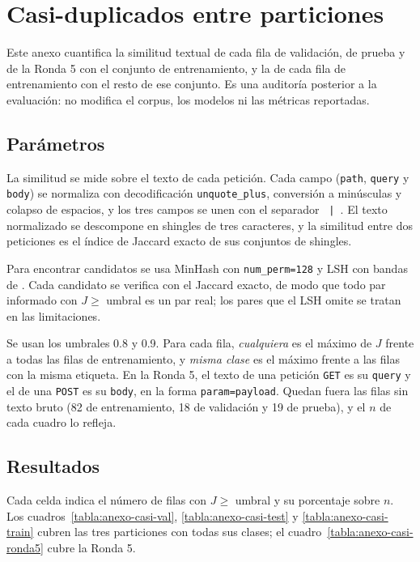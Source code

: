 \section{Casi-duplicados entre particiones}\label{anexo:casi-duplicados}

Este anexo cuantifica la similitud textual de cada fila de validación, de prueba y de la Ronda 5 con el conjunto de entrenamiento, y la de cada fila de entrenamiento con el resto de ese conjunto. Es una auditoría posterior a la evaluación: no modifica el corpus, los modelos ni las métricas reportadas.

\subsection{Parámetros}\label{anexo:casi-parametros}

La similitud se mide sobre el texto de cada petición. Cada campo (\texttt{path}, \texttt{query} y \texttt{body}) se normaliza con decodificación \texttt{unquote\_plus}, conversión a minúsculas y colapso de espacios, y los tres campos se unen con el separador \texttt{ | }. El texto normalizado se descompone en shingles de tres caracteres, y la similitud entre dos peticiones es el índice de Jaccard exacto de sus conjuntos de shingles.

Para encontrar candidatos se usa MinHash con \texttt{num\_perm=128} y LSH con bandas de . Cada candidato se verifica con el Jaccard exacto, de modo que todo par informado con $J \geq$ umbral es un par real; los pares que el LSH omite se tratan en las limitaciones.

Se usan los umbrales 0.8 y 0.9. Para cada fila, \textit{cualquiera} es el máximo de $J$ frente a todas las filas de entrenamiento, y \textit{misma clase} es el máximo frente a las filas con la misma etiqueta. En la Ronda 5, el texto de una petición \texttt{GET} es su \texttt{query} y el de una \texttt{POST} es su \texttt{body}, en la forma \texttt{param=payload}. Quedan fuera las filas sin texto bruto (82 de entrenamiento, 18 de validación y 19 de prueba), y el $n$ de cada cuadro lo refleja.

\subsection{Resultados}\label{anexo:casi-resultados}

Cada celda indica el número de filas con $J \geq$ umbral y su porcentaje sobre $n$. Los cuadros~\ref{tabla:anexo-casi-val}, \ref{tabla:anexo-casi-test} y \ref{tabla:anexo-casi-train} cubren las tres particiones con todas sus clases; el cuadro~\ref{tabla:anexo-casi-ronda5} cubre la Ronda 5.

